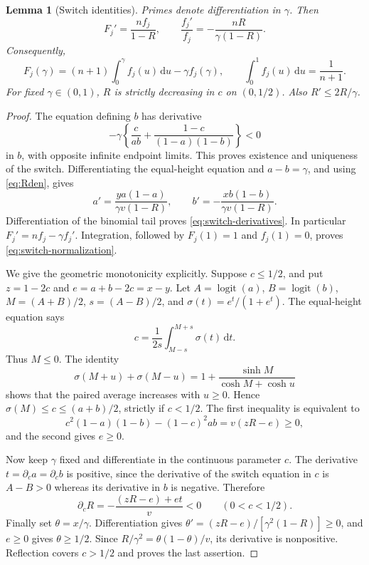 \documentclass[11pt]{article}
\numberwithin{equation}{section}
\newtheorem{lemma}[theorem]{Lemma}
\theoremstyle{remark}\newtheorem{remark}[theorem]{Remark}
\newcommand{\dd}{\,\mathrm d}
\begin{document}
\begin{lemma}[Switch identities]\label{lem:switch-identities}
Primes denote differentiation in $\gamma$. Then
\begin{equation}\label{eq:switch-derivatives}
 F_j'=\frac{nf_j}{1-R},\qquad
 \frac{f_j'}{f_j}=-\frac{nR}{\gamma(1-R)}.
\end{equation}
Consequently,
\begin{equation}\label{eq:switch-normalization}
 F_j(\gamma)=(n+1)\int_0^\gamma f_j(u)\dd u-\gamma f_j(\gamma),\qquad
 \int_0^1f_j(u)\dd u=\frac1{n+1}.
\end{equation}
For fixed $\gamma\in(0,1)$, $R$ is strictly decreasing in $c$ on
$(0,1/2)$. Also $R'\le2R/\gamma$.
\end{lemma}
\begin{proof}
The equation defining $b$ has derivative
\[
 -\gamma\left\{\frac c{ab}+\frac{1-c}{(1-a)(1-b)}\right\}<0
\]
in $b$, with opposite infinite endpoint limits. This proves existence
and uniqueness of the switch. Differentiating the equal-height equation
and $a-b=\gamma$, and using \eqref{eq:Rden}, gives
\[
 a'=\frac{y a(1-a)}{\gamma v(1-R)},\qquad
 b'=-\frac{x b(1-b)}{\gamma v(1-R)}.
\]
Differentiation of the binomial tail proves
\eqref{eq:switch-derivatives}. In particular $F_j'=nf_j-\gamma f_j'$.
Integration, followed by $F_j(1)=1$ and $f_j(1)=0$, proves
\eqref{eq:switch-normalization}.

We give the geometric monotonicity explicitly. Suppose $c\le1/2$, and
put $z=1-2c$ and $e=a+b-2c=x-y$. Let $A=\operatorname{logit}(a)$,
$B=\operatorname{logit}(b)$, $M=(A+B)/2$, $s=(A-B)/2$, and
$\sigma(t)=e^t/(1+e^t)$. The equal-height equation says
\[
 c=\frac1{2s}\int_{M-s}^{M+s}\sigma(t)\dd t.
\]
Thus $M\le0$. The identity
\[
 \sigma(M+u)+\sigma(M-u)
 =1+\frac{\sinh M}{\cosh M+\cosh u}
\]
shows that the paired average increases with $u\ge0$. Hence
$\sigma(M)\le c\le(a+b)/2$, strictly if $c<1/2$. The first inequality
is equivalent to
\[
 c^2(1-a)(1-b)-(1-c)^2ab=v(zR-e)\ge0,
\]
and the second gives $e\ge0$.

Now keep $\gamma$ fixed and differentiate in the continuous parameter
$c$. The derivative $t=\partial_c a=\partial_c b$ is positive, since
the derivative of the switch equation in $c$ is $A-B>0$ whereas its
derivative in $b$ is negative. Therefore
\begin{equation}\label{eq:Rcentering}
 \partial_cR=-\frac{(zR-e)+et}{v}<0\qquad(0<c<1/2).
\end{equation}
Finally set $\theta=x/\gamma$. Differentiation gives
$\theta'=(zR-e)/[\gamma^2(1-R)]\ge0$, and $e\ge0$ gives
$\theta\ge1/2$. Since
$R/\gamma^2=\theta(1-\theta)/v$, its derivative is nonpositive.
Reflection covers $c>1/2$ and proves the last assertion.
\end{proof}
\end{document}

